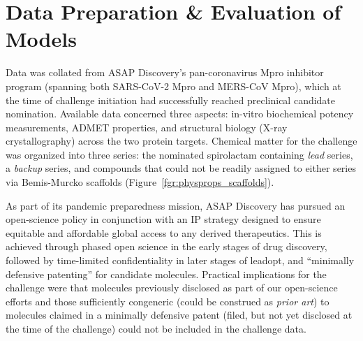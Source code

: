 \documentclass[journal=jcim,manuscript=article]{achemso}
\begin{document}
\section{Data Preparation \& Evaluation of Models}

Data was collated from ASAP Discovery’s pan-coronavirus Mpro inhibitor program (spanning both SARS-CoV-2 Mpro and MERS-CoV Mpro), which at the time of challenge initiation had successfully reached preclinical candidate nomination. Available data concerned three aspects: in-vitro biochemical potency measurements, ADMET properties, and structural biology (X-ray crystallography) across the two protein targets. Chemical matter for the challenge was organized into three series: the nominated spirolactam containing \textit{lead} series, a \textit{backup} series, and compounds that could not be readily assigned to either series via Bemis-Murcko scaffolds\cite{bemis_murcko_1996} (Figure~\ref{fgr:physprops_scaffolds}).

As part of its pandemic preparedness mission, ASAP Discovery has pursued an open-science policy in conjunction with an IP strategy designed to ensure equitable and affordable global access to any derived therapeutics. This is achieved through phased open science in the early stages of drug discovery, followed by time-limited confidentiality in later stages of leadopt, and “minimally defensive patenting” for candidate molecules\cite{griffen_2024}. Practical implications for the challenge were that molecules previously disclosed as part of our open-science efforts and those sufficiently congeneric (could be construed as \textit{prior art}\cite{ACS_patents}) to molecules claimed in a minimally defensive patent (filed, but not yet disclosed at the time of the challenge) could not be included in the challenge data.
\end{document}
